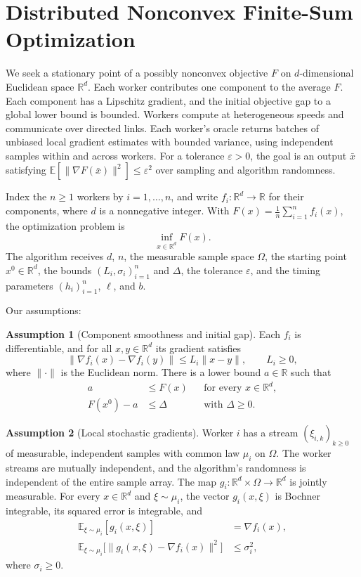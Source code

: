 \documentclass[10pt]{article}
\theoremstyle{definition}
\newtheorem{assumption}{Assumption}
\begin{document}
\section*{Distributed Nonconvex Finite-Sum Optimization}
We seek a stationary point of a possibly nonconvex objective $F$ on $d$-dimensional Euclidean space $\mathbb{R}^d$. Each worker contributes one component to the average $F$. Each component has a Lipschitz gradient, and the initial objective gap to a global lower bound is bounded. Workers compute at heterogeneous speeds and communicate over directed links. Each worker's oracle returns batches of unbiased local gradient estimates with bounded variance, using independent samples within and across workers. For a tolerance $\varepsilon>0$, the goal is an output $\bar{x}$ satisfying $\mathbb{E}[\|\nabla F(\bar{x})\|^2]\leq\varepsilon^2$ over sampling and algorithm randomness.

Index the $n\geq 1$ workers by $i=1,\ldots,n$, and write $f_i:\mathbb{R}^d\to\mathbb{R}$ for their components, where $d$ is a nonnegative integer. With $F(x)=\frac{1}{n}\sum_{i=1}^n f_i(x)$, the optimization problem is
\[
\inf_{x\in\mathbb{R}^d} F(x).
\]
The algorithm receives $d$, $n$, the measurable sample space $\Omega$, the starting point $x^0\in\mathbb{R}^d$, the bounds $(L_i,\sigma_i)_{i=1}^n$ and $\Delta$, the tolerance $\varepsilon$, and the timing parameters $(h_i)_{i=1}^n$, $\ell$, and $b$.

Our assumptions:
\begin{assumption}[Component smoothness and initial gap]
Each $f_i$ is differentiable, and for all $x,y\in\mathbb{R}^d$ its gradient satisfies
\[
\|\nabla f_i(x)-\nabla f_i(y)\|\leq L_i\|x-y\|,
\qquad L_i\geq 0,
\]
where $\|\cdot\|$ is the Euclidean norm. There is a lower bound $a\in\mathbb{R}$ such that
\[
\begin{aligned}
a &\leq F(x) &&\text{for every }x\in\mathbb{R}^d,\\
F(x^0)-a &\leq \Delta &&\text{with }\Delta\geq 0.
\end{aligned}
\]
\end{assumption}

\begin{assumption}[Local stochastic gradients]
Worker $i$ has a stream $(\xi_{i,k})_{k\geq 0}$ of measurable, independent samples with common law $\mu_i$ on $\Omega$. The worker streams are mutually independent, and the algorithm's randomness is independent of the entire sample array. The map $g_i:\mathbb{R}^d\times\Omega\to\mathbb{R}^d$ is jointly measurable. For every $x\in\mathbb{R}^d$ and $\xi\sim\mu_i$, the vector $g_i(x,\xi)$ is Bochner integrable, its squared error is integrable, and
\[
\begin{aligned}
\mathbb{E}_{\xi\sim\mu_i}[g_i(x,\xi)] &= \nabla f_i(x),\\
\mathbb{E}_{\xi\sim\mu_i}\bigl[\|g_i(x,\xi)-\nabla f_i(x)\|^2\bigr] &\leq \sigma_i^2,
\end{aligned}
\]
where $\sigma_i\geq 0$.
\end{assumption}
\end{document}
